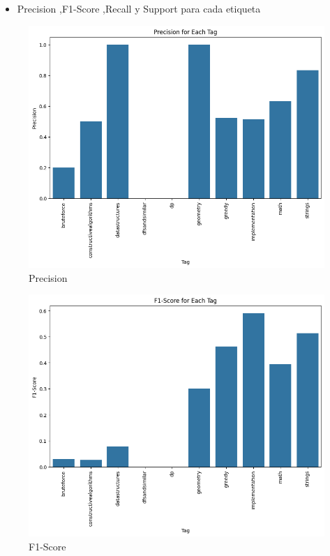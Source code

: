 \documentclass{article}
\begin{document}
\newpage
\begin{itemize}
    \item Precision ,F1-Score ,Recall y Support para cada etiqueta
\end{itemize}
\begin{figure}[H]
    \centering
    \includegraphics[scale=0.49]{imgs/precisonnb.png}
    \caption{Precision}
    \label{fig:p}
\end{figure}
\begin{figure}[H]
    \centering
    \includegraphics[scale=0.49]{imgs/f1nb.png}
    \caption{F1-Score}
    \label{fig:f1}
\end{figure}
\end{document}
